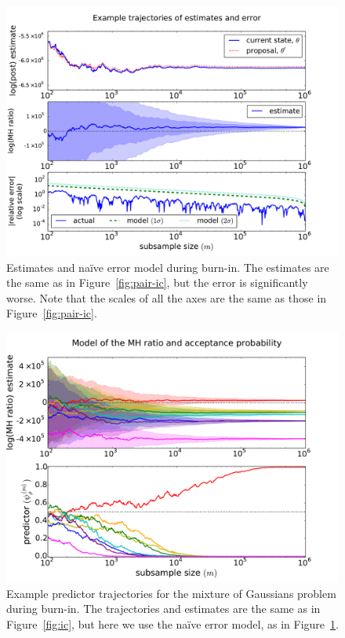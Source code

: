 \documentclass[angelino.tex]{subfiles}
\begin{document}
\begin{figure}[t!]
\begin{center}
\includegraphics[width=\textwidth]{figs/eddie/mix-ic-traces-pair.pdf}
\end{center}
\caption{Estimates and na\"ive error model during burn-in.
The estimates are the same as in Figure~\ref{fig:pair-ic},
but the error is significantly worse.
Note that the scales of all the axes are the same as those in Figure~\ref{fig:pair-ic}.}
\label{fig:naive-error}
\end{figure} 

\begin{figure}[t!]
\begin{center}
\includegraphics[width=\textwidth]{figs/eddie/mix-ic-traces.pdf}
\end{center}
\caption{Example predictor trajectories for the mixture of Gaussians problem
during burn-in.
The trajectories and estimates are the same as in Figure~\ref{fig:ic},
but here we use the na\"ive error model, as in Figure~\ref{fig:naive-error}.
}
\label{fig:naive-predictor}
\end{figure} 
\end{document}

